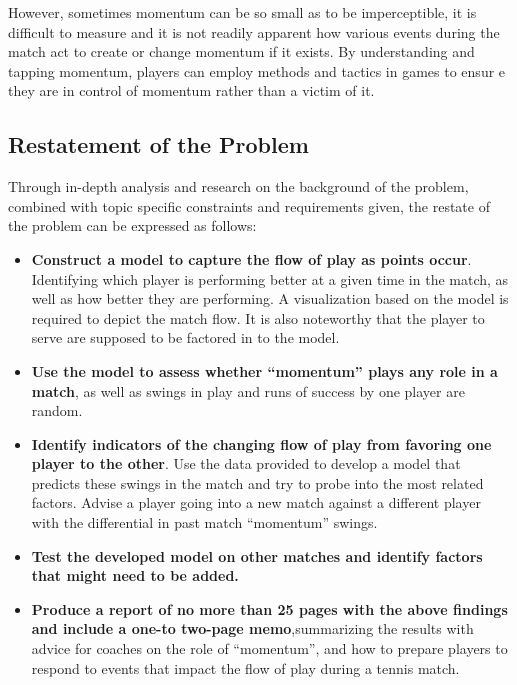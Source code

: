 \documentclass{mcmthesis}
\begin{document}
    However, sometimes momentum can be so small as to be imperceptible, it is difficult to
measure and it is not readily apparent how various events during the match act to create or change
momentum if it exists. By understanding and tapping momentum, players can employ methods
and tactics in games to ensur
e they are in control of momentum rather than a victim of it.

\subsection{Restatement of the Problem}

    Through in-depth analysis and research on the background of the problem, combined with
topic specific constraints and requirements given, the restate of the problem can be expressed as
follows:

\begin{itemize}
\item {\bf Construct a model to capture the flow of play as points occur}. Identifying which player
is performing better at a given time in the match, as well as how better they are performing. A
visualization based on the model is required to depict the match flow. It is also noteworthy
that the player to serve are supposed to be factored in to the model.
    
\item {\bf Use the model to assess whether “momentum” plays any role in a match}, as well as
swings in play and runs of success by one player are random.

\item {\bf Identify indicators of the changing flow of play from favoring one player to the other}. Use the data provided to develop a model that predicts these swings in the match and try to
probe into the most related factors. Advise a player going into a new match against a
different player with the differential in past match “momentum” swings. 
    
\item {\bf Test the developed model on other matches and identify factors that might need to be
added.}
    
\item {\bf Produce a report of no more than 25 pages with the above findings and include a one-to two-page memo},summarizing the results with advice for coaches on the role of “momentum”, and how to prepare players to respond to events that impact the flow of play
during a tennis match.
\end{itemize}
\end{document}
